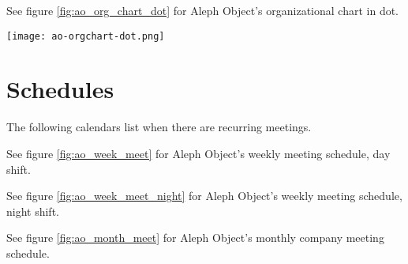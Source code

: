 See figure \ref{fig:ao_org_chart_dot} for Aleph Object's organizational chart in dot.

\begin{sidewaysfigure}[p]
\texttt{[image: ao-orgchart-dot.png]}
 \caption{Aleph Objects Org Chart dot}
 \label{fig:ao_org_chart_dot}
\end{sidewaysfigure}

\section{Schedules}
The following calendars list when there are recurring meetings.


See figure \ref{fig:ao_week_meet} for Aleph Object's weekly meeting schedule, day shift.

See figure \ref{fig:ao_week_meet_night} for Aleph Object's weekly meeting schedule, night shift.

See figure \ref{fig:ao_month_meet} for Aleph Object's monthly company meeting schedule.
